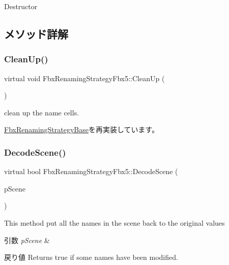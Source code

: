 Destructor 



\subsection{メソッド詳解}
\mbox{\label{class_fbx_renaming_strategy_fbx5_a581d1d5e0b4fcc9f9702be12669fc795}} 
\subsubsection{\texorpdfstring{Clean\+Up()}{CleanUp()}}
{\footnotesize\ttfamily virtual void Fbx\+Renaming\+Strategy\+Fbx5\+::\+Clean\+Up (\begin{DoxyParamCaption}{ }\end{DoxyParamCaption})\hspace{0.3cm}{\ttfamily [virtual]}}



clean up the name cells. 



\hyperlink{class_fbx_renaming_strategy_base_ae1ab8784f6769fce3068ee21e3c34196}{Fbx\+Renaming\+Strategy\+Base}を再実装しています。

\mbox{\label{class_fbx_renaming_strategy_fbx5_a3af6482297f78deb29a48a9f26ded270}} 
\subsubsection{\texorpdfstring{Decode\+Scene()}{DecodeScene()}}
{\footnotesize\ttfamily virtual bool Fbx\+Renaming\+Strategy\+Fbx5\+::\+Decode\+Scene (\begin{DoxyParamCaption}\item[{\hyperlink{class_fbx_scene}{Fbx\+Scene} $\ast$}]{p\+Scene }\end{DoxyParamCaption})\hspace{0.3cm}{\ttfamily [virtual]}}

This method put all the names in the scene back to the original values 
\begin{DoxyParams}{引数}
{\em p\+Scene} & \\
\hline
\end{DoxyParams}
\begin{DoxyReturn}{戻り値}
Returns true if some names have been modified. 
\end{DoxyReturn}


